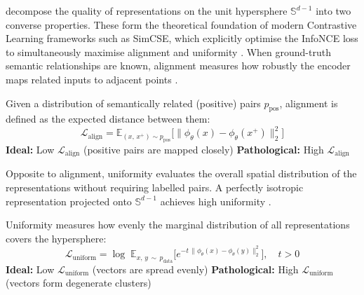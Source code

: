 \citet{wang-isola-2020-contrastive} decompose the quality of representations on the unit hypersphere $\mathbb{S}^{d-1}$ into two converse properties. These form the theoretical foundation of modern Contrastive Learning frameworks such as SimCSE, which explicitly optimise the InfoNCE loss to simultaneously maximise alignment and uniformity \cite{gao-etal-2021-simcse}. When ground-truth semantic relationships are known, alignment measures how robustly the encoder maps related inputs to adjacent points \cite{wang-isola-2020-contrastive}.

\begin{metricbox}
Given a distribution of semantically related (positive) pairs $p_{\mathrm{pos}}$, alignment is defined as the expected distance between them:
\begin{equation}
    \mathcal{L}_{\mathrm{align}} = \mathbb{E}_{(x,\, x^+) \sim p_{\mathrm{pos}}} \bigl[\|\phi_\theta(x) - \phi_\theta(x^+)\|_2^2\bigr]
    \label{met:alignment}
\end{equation}
\textbf{Ideal:} Low $\mathcal{L}_{\mathrm{align}}$ (positive pairs are mapped closely) \quad \textbf{Pathological:} High $\mathcal{L}_{\mathrm{align}}$
\end{metricbox}

Opposite to alignment, uniformity evaluates the overall spatial distribution of the representations without requiring labelled pairs. A perfectly isotropic representation projected onto $\mathbb{S}^{d-1}$ achieves high uniformity \cite{wang-isola-2020-contrastive}.

\begin{metricbox}
Uniformity measures how evenly the marginal distribution of all representations covers the hypersphere:
\begin{equation}
    \mathcal{L}_{\mathrm{uniform}} = \log\;\mathbb{E}_{x,\, y \,\sim\, p_{\mathrm{data}}} \bigl[e^{-t\,\|\phi_\theta(x) - \phi_\theta(y)\|_2^2}\bigr], \quad t > 0
    \label{met:uniformity}
\end{equation}
\textbf{Ideal:} Low $\mathcal{L}_{\mathrm{uniform}}$ (vectors are spread evenly) \quad \textbf{Pathological:} High $\mathcal{L}_{\mathrm{uniform}}$ (vectors form degenerate clusters)
\end{metricbox}


